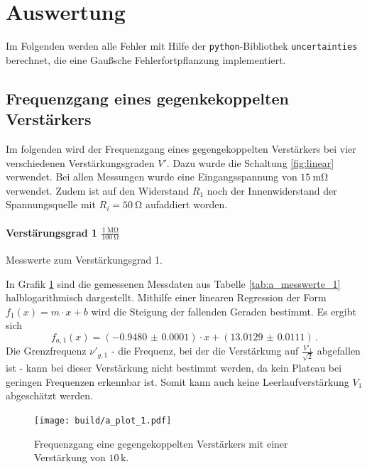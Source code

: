 \section{Auswertung}
\label{sec:auswertung}
Im Folgenden werden alle Fehler mit Hilfe der \texttt{python}-Bibliothek
\texttt{uncertainties}\cite{py-uncertainties} berechnet, die eine Gaußsche
Fehlerfortpflanzung implementiert.

\subsection{Frequenzgang eines gegenkekoppelten Verstärkers} %

Im folgenden wird der Frequenzgang eines gegengekoppelten Verstärkers bei vier verschiedenen Verstärkungsgraden $V'$.
Dazu wurde die Schaltung \ref{fig:linear} verwendet.
Bei allen Messungen wurde eine Eingangsspannung von $\SI{15}{\milli\ohm}$ verwendet.
Zudem ist auf den Widerstand $R_1$ noch der Innenwiderstand der Spannungsquelle mit $R_i = \SI{50}{\ohm}$ aufaddiert worden.

\paragraph{Verstärungsgrad 1 $\frac{\SI{1}{\mega\ohm}}{\SI{100}{\ohm}}$}

\begin{table}
\centering
\caption{Messwerte zum Verstärkungsgrad 1.}
    \label{tab:a_messwerte_1}
    
\end{table}

In Grafik \ref{fig:a_plot_1} sind die gemessenen Messdaten aus Tabelle \ref{tab:a_messwerte_1} halblogarithmisch dargestellt.
Mithilfe einer linearen Regression der Form $f_1(x)= m \cdot x + b$ wird die Steigung der fallenden Geraden bestimmt.
Es ergibt sich
\begin{equation*}
	f_{a,1}(x) = (\num{-0.9480(1)}) \cdot x + (\num{13.0129(111)})\,.
\end{equation*}
Die Grenzfrequenz $\nu'_{g,1}$ - die Frequenz, bei der die Verstärkung auf $\frac{V'_1}{\sqrt{2}}$ abgefallen ist - kann bei dieser Verstärkung nicht bestimmt werden, da kein Plateau bei geringen Frequenzen erkennbar ist.
Somit kann auch keine Leerlaufverstärkung $V_1$ abgeschätzt werden.

\begin{figure}[h!]
    \centering
    \texttt{[image: build/a\_plot\_1.pdf]}
    \caption{Frequenzgang eine gegengekoppelten Verstärkers mit einer Verstärkung von $10\,\mathrm{k}$.}
    \label{fig:a_plot_1}
\end{figure}

